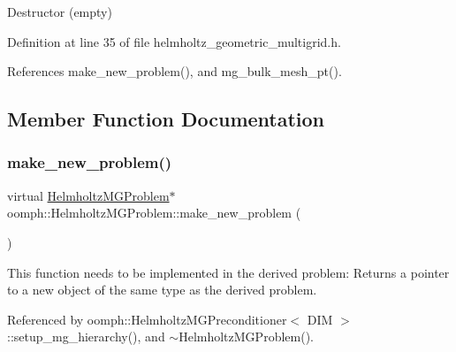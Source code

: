 Destructor (empty) 



Definition at line 35 of file helmholtz\+\_\+geometric\+\_\+multigrid.\+h.



References make\+\_\+new\+\_\+problem(), and mg\+\_\+bulk\+\_\+mesh\+\_\+pt().



\subsection{Member Function Documentation}
\mbox{\label{classoomph_1_1HelmholtzMGProblem_aba0155964004b8fea5975957e0892863}} 
\subsubsection{\texorpdfstring{make\+\_\+new\+\_\+problem()}{make\_new\_problem()}}
{\footnotesize\ttfamily virtual \hyperlink{classoomph_1_1HelmholtzMGProblem}{Helmholtz\+M\+G\+Problem}$\ast$ oomph\+::\+Helmholtz\+M\+G\+Problem\+::make\+\_\+new\+\_\+problem (\begin{DoxyParamCaption}{ }\end{DoxyParamCaption})\hspace{0.3cm}{\ttfamily [pure virtual]}}



This function needs to be implemented in the derived problem\+: Returns a pointer to a new object of the same type as the derived problem. 



Referenced by oomph\+::\+Helmholtz\+M\+G\+Preconditioner$<$ D\+I\+M $>$\+::setup\+\_\+mg\+\_\+hierarchy(), and $\sim$\+Helmholtz\+M\+G\+Problem().

\mbox{\label{classoomph_1_1HelmholtzMGProblem_aeae03594fd61961d0f62aef58ae97a92}} 
